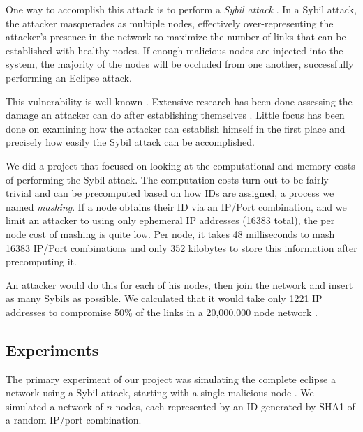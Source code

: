 One way to accomplish this attack is to perform a \emph{Sybil attack} \cite{sybil}.
In a Sybil attack, the attacker masquerades as multiple nodes, effectively over-representing the attacker's presence in the network to maximize the number of links that can be established with healthy nodes.
If enough malicious nodes are injected into the system, the majority of the nodes will be occluded from one another, successfully performing an Eclipse attack.


This vulnerability is well known \cite{dhtsec}.
Extensive research has been done assessing the damage an attacker can do after establishing themselves \cite{srivatsa2004vulnerabilities}.
Little focus has been done on examining how the attacker can establish himself in the first place and precisely how easily the Sybil attack can be accomplished.

We did a project that focused on looking at the computational and memory costs of performing the Sybil attack.
The computation costs turn out to be fairly trivial and can be precomputed based on how IDs are assigned, a process we named \textit{mashing}.
If a node obtains their ID via an IP/Port combination, and we limit an attacker to using only ephemeral IP addresses (16383 total), the per node cost of mashing is quite low.
Per node, it takes 48 milliseconds to mash 16383 IP/Port combinations and only 352 kilobytes to store this information after precomputing it.

An attacker would do this for each of his nodes, then join the network and insert as many Sybils as possible.
We calculated that it would take only 1221 IP addresses to compromise 50\% of the links in a 20,000,000 node network \cite{sybil-analysis}.


\subsection{Experiments}
The primary experiment of our project was simulating the complete eclipse a network using a Sybil attack, starting with a single malicious node \cite{sybil-analysis}.
We simulated a network of $n$ nodes, each represented by an ID generated by SHA1 of a random IP/port combination.

